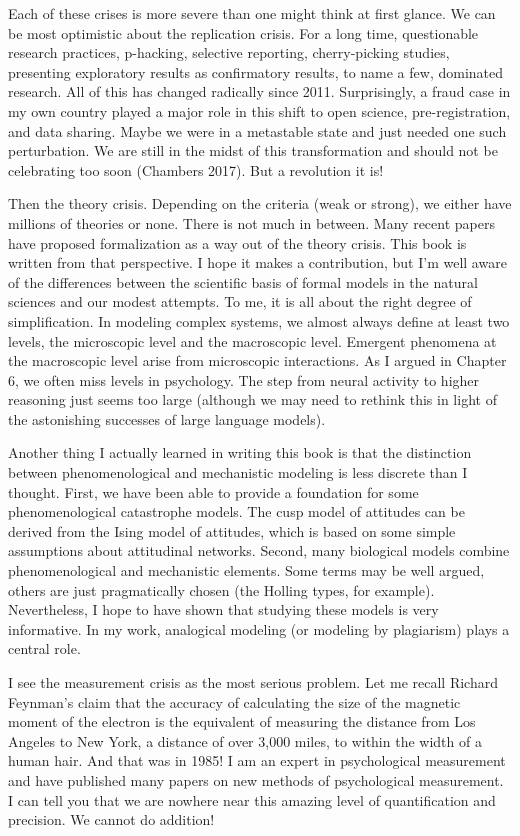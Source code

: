 \documentclass[
  letterpaper,
]{scrbook}
\begin{document}
Each of these crises is more severe than one might think at first
glance. We can be most optimistic about the replication crisis. For a
long time, questionable research practices, p-hacking, selective
reporting, cherry-picking studies, presenting exploratory results as
confirmatory results, to name a few, dominated research. All of this has
changed radically since 2011. Surprisingly, a fraud case in my own
country played a major role in this shift to open science,
pre-registration, and data sharing. Maybe we were in a metastable state
and just needed one such perturbation. We are still in the midst of this
transformation and should not be celebrating too soon (Chambers 2017).
But a revolution it is!

Then the theory crisis. Depending on the criteria (weak or strong), we
either have millions of theories or none. There is not much in between.
Many recent papers have proposed formalization as a way out of the
theory crisis. This book is written from that perspective. I hope it
makes a contribution, but I'm well aware of the differences between the
scientific basis of formal models in the natural sciences and our modest
attempts. To me, it is all about the right degree of simplification. In
modeling complex systems, we almost always define at least two levels,
the microscopic level and the macroscopic level. Emergent phenomena at
the macroscopic level arise from microscopic interactions. As I argued
in Chapter 6, we often miss levels in psychology. The step from neural
activity to higher reasoning just seems too large (although we may need
to rethink this in light of the astonishing successes of large language
models).

Another thing I actually learned in writing this book is that the
distinction between phenomenological and mechanistic modeling is less
discrete than I thought. First, we have been able to provide a
foundation for some phenomenological catastrophe models. The cusp model
of attitudes can be derived from the Ising model of attitudes, which is
based on some simple assumptions about attitudinal networks. Second,
many biological models combine phenomenological and mechanistic
elements. Some terms may be well argued, others are just pragmatically
chosen (the Holling types, for example). Nevertheless, I hope to have
shown that studying these models is very informative. In my work,
analogical modeling (or modeling by plagiarism) plays a central role.

I see the measurement crisis as the most serious problem. Let me recall
Richard Feynman's claim that the accuracy of calculating the size of the
magnetic moment of the electron is the equivalent of measuring the
distance from Los Angeles to New York, a distance of over 3,000 miles,
to within the width of a human hair. And that was in 1985! I am an
expert in psychological measurement and have published many papers on
new methods of psychological measurement. I can tell you that we are
nowhere near this amazing level of quantification and precision. We
cannot do addition!
\end{document}
